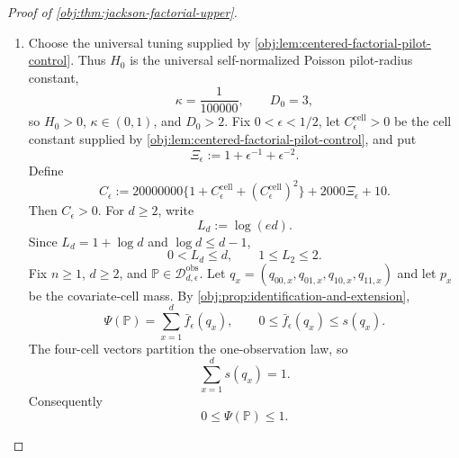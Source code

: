 \begin{proof}[Proof of \cref{obj:thm:jackson-factorial-upper}]
\begin{enumerate}
\item Choose the universal tuning supplied by
\cref{obj:lem:centered-factorial-pilot-control}.  Thus \(H_0\) is the
universal self-normalized Poisson pilot-radius constant,
\[
\kappa=\frac{1}{100000},
\qquad
D_0=3,
\]
so \(H_0>0\), \(\kappa\in(0,1)\), and \(D_0>2\).  Fix
\(0<\epsilon<1/2\), let \(C_{\epsilon}^{\mathrm{cell}}>0\) be the cell
constant supplied by \cref{obj:lem:centered-factorial-pilot-control}, and put
\[
\Xi_\epsilon:=1+\epsilon^{-1}+\epsilon^{-2}.
\]
Define
\[
C_\epsilon
:=
20000000\{1+C_{\epsilon}^{\mathrm{cell}}+(C_{\epsilon}^{\mathrm{cell}})^2\}
+
2000\Xi_\epsilon+10 .
\]
Then \(C_\epsilon>0\).  For \(d\ge2\), write
\[
L_d:=\log(ed).
\]
Since \(L_d=1+\log d\) and \(\log d\le d-1\),
\[
0<L_d\le d,
\qquad
1\le L_2\le2 .
\]
Fix \(n\ge1\), \(d\ge2\), and
\(\mathbb P\in\mathcal D_{d,\epsilon}^{\mathrm{obs}}\).  Let
\(q_x=(q_{00,x},q_{01,x},q_{10,x},q_{11,x})\) and let \(p_x\) be the
covariate-cell mass.  By \cref{obj:prop:identification-and-extension},
\[
\Psi(\mathbb P)=\sum_{x=1}^d \bar f_\epsilon(q_x),
\qquad
0\le \bar f_\epsilon(q_x)\le s(q_x).
\]
The four-cell vectors partition the one-observation law, so
\[
\sum_{x=1}^d s(q_x)=1 .
\]
Consequently
\[
0\le \Psi(\mathbb P)\le1 .
\]


\end{enumerate}
\end{proof}
